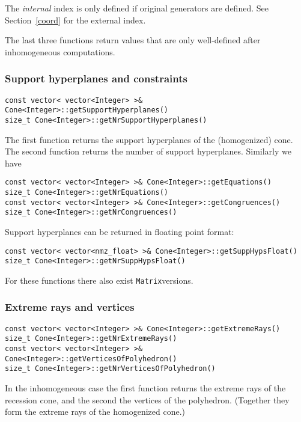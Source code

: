\documentclass[12pt,a4paper]{scrartcl}
\theoremstyle{definition}
\def\ttt{\texttt}
\begin{document}
\begin{small}
The \emph{internal} index is only defined if original generators are defined. See Section~\ref{coord} for the external index.

The last three functions return values that are only well-defined after inhomogeneous computations.

\subsubsection{Support hyperplanes and constraints}\label{SHC}

\begin{Verbatim}
const vector< vector<Integer> >& Cone<Integer>::getSupportHyperplanes()
size_t Cone<Integer>::getNrSupportHyperplanes()
\end{Verbatim}

The first function returns the support hyperplanes of the (homogenized) cone.
The second function returns the number of support hyperplanes. Similarly we have

\begin{Verbatim}
const vector< vector<Integer> >& Cone<Integer>::getEquations()
size_t Cone<Integer>::getNrEquations()
const vector< vector<Integer> >& Cone<Integer>::getCongruences()
size_t Cone<Integer>::getNrCongruences()
\end{Verbatim}

Support hyperplanes can be returned in floating point format:
\begin{Verbatim}
const vector< vector<nmz_float> >& Cone<Integer>::getSuppHypsFloat()
size_t Cone<Integer>::getNrSuppHypsFloat()
\end{Verbatim}

For these functions there also exist \ttt{Matrix}versions.

\subsubsection{Extreme rays and vertices}

\begin{Verbatim}
const vector< vector<Integer> >& Cone<Integer>::getExtremeRays()
size_t Cone<Integer>::getNrExtremeRays()
const vector< vector<Integer> >& Cone<Integer>::getVerticesOfPolyhedron()
size_t Cone<Integer>::getNrVerticesOfPolyhedron()
\end{Verbatim}

In the inhomogeneous case the first function returns the extreme rays of the recession cone, and the second the vertices of the polyhedron. (Together they form the extreme rays of the homogenized cone.)


\end{small}
\end{document}
